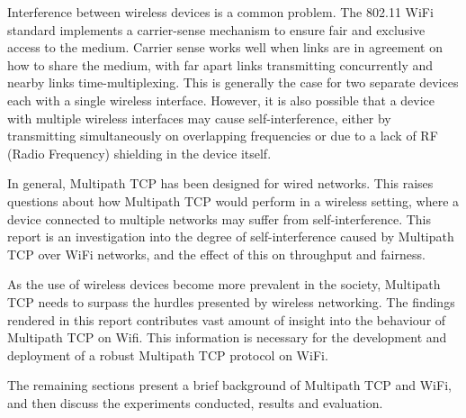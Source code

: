 Interference between wireless devices is a common problem. The 802.11 WiFi
standard implements a carrier-sense mechanism to ensure fair and exclusive
access to the medium. Carrier sense works well when links are in agreement on 
how to share the medium, with far apart links transmitting concurrently and 
nearby links time-multiplexing. This is generally the case for two separate 
devices each with a single wireless interface. However, it is also possible that 
a device with multiple wireless interfaces may cause self-interference, either 
by transmitting simultaneously on overlapping frequencies or due to a lack of RF
(Radio Frequency) shielding in the device itself.

In general, Multipath TCP has been designed for wired networks. This raises
questions about how Multipath TCP would perform in a wireless setting, where a
device connected to multiple networks may suffer from self-interference. This
report is an investigation into the degree of self-interference caused by
Multipath TCP over WiFi networks, and the effect of this on throughput and
fairness.

As the use of wireless devices become more prevalent in the society, Multipath 
TCP needs to surpass the hurdles presented by wireless networking. The findings 
rendered in this report contributes vast amount of insight into the behaviour of 
Multipath TCP on Wifi. This information is necessary for the development and 
deployment of a robust Multipath TCP protocol on WiFi.

The remaining sections present a brief background of Multipath TCP and WiFi, and
then discuss the experiments conducted, results and evaluation.
